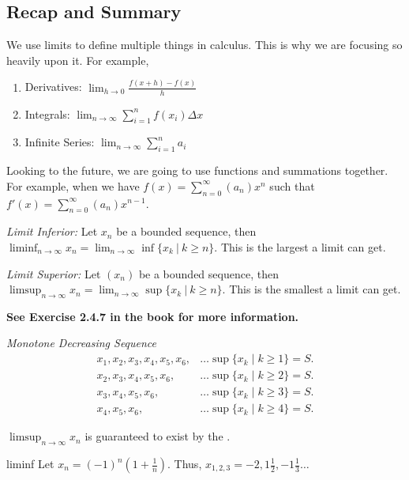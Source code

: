\subsection{Recap and Summary}

We use limits to define multiple things in calculus. This is why we are focusing so heavily upon it. For example,

\begin{enumerate}
    \item Derivatives: \(\lim_{h \to 0} \frac{f(x + h) - f(x)}{h}\)
    \item Integrals: \(\lim_{n \to \infty} \sum_{i = 1}^{n} f(x_i) \Delta x\)
    \item Infinite Series: \(\lim_{n \to \infty} \sum_{i = 1}^{n} a_i\)
\end{enumerate}

Looking to the future, we are going to use functions and summations together. For example, when we have \(f(x) = \sum_{n=0}^\infty (a_n)x^n\) such that \(f'(x) = \sum_{n=0}^\infty (a_n)x^{n-1}\).


\textit{Limit Inferior:} Let \(x_n\) be a bounded sequence, then \(\liminf_{n \to \infty} x_n = \lim_{n \to \infty} \inf\{x_k \ | \ k \geq n\}\). This is the largest a limit can get.

\textit{Limit Superior:} Let \((x_n)\) be a bounded sequence, then \(\limsup_{n \to \infty} x_n = \lim_{n \to \infty} \sup\{x_k \ | \ k \geq n\}\). This is the smallest a limit can get.

\textbf{See Exercise 2.4.7 in the book for more information.}

\begin{example}
    {\textit{Monotone Decreasing Sequence}} \begin{align*}
        x_1, x_2, x_3, x_4, x_5, x_6, &\dots \sup\{x_k \mid k \geq 1\} = S. \\
        x_2, x_3, x_4, x_5, x_6, &\dots \sup\{x_k \mid k \geq 2\} = S. \\
        x_3, x_4, x_5, x_6, &\dots \sup\{x_k \mid k \geq 3\} = S. \\
        x_4, x_5, x_6, &\dots \sup\{x_k \mid k \geq 4\} = S. 
    \end{align*}
\end{example}

\(\limsup_{n \to \infty} x_n\) is guaranteed to exist by the . 

\begin{example}
    {liminf} Let \(x_n = (-1)^n(1 + \frac{1}{n})\). Thus, \(x_{1,2,3} = -2,1\frac{1}{2},-1\frac{1}{3}\dots\)
\end{example}

